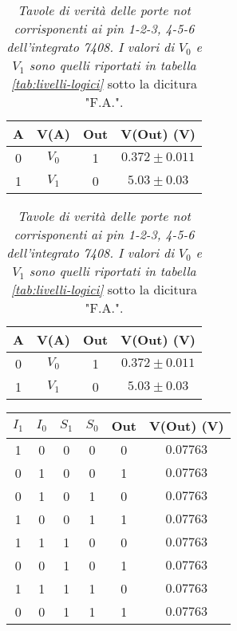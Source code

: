 \begin{table}[H]
  \centering
  \begin{subtable}
    \centering
    \begin{tabular}[t]{c  c | c  c }
      \hline
      A & V(A) & Out & V(Out) (V) \\
      \hline
      0 & $V_{0}$ & 1 & $0.372 \pm 0.011$ \\
      1& $V_{1}$ & 0 & $5.03 \pm 0.03$ \\
      \hline
    \end{tabular}
  \end{subtable}
  \vspace{.5mm}
  \begin{subtable}
    \centering
    \begin{tabular}[t]{c  c | c  c }
      \hline
      A & V(A) & Out & V(Out) (V) \\
      \hline
      0 & $V_{0}$ & 1 & $0.372 \pm 0.011$ \\
      1& $V_{1}$ & 0 & $5.03 \pm 0.03$ \\
      \hline
    \end{tabular}
  \end{subtable}
  \caption{\emph{Tavole di verità delle porte \emph{not} corrisponenti ai pin 1-2-3, 4-5-6 dell'integrato 7408. I valori di $V_{0}$ e $V_{1}$ sono quelli riportati in tabella \ref{tab:livelli-logici}} sotto la dicitura "F.A.".}
  \label{tab:not-multiplexer}
\end{table}

\begin{table}[H]
  \centering
  \begin{tabular}{c c | c c | c c }
    \hline
    $I_{1}$ & $I_{0}$ & $S_{1}$ & $S_{0}$ & Out & V(Out) (V) \\
    \hline
    1 & 0 & 0 & 0 & 0 & $0.07763$ \\
    0 & 1 & 0 & 0 & 1 & $0.07763$ \\
    0 & 1 & 0 & 1 & 0 & $0.07763$ \\
    1 & 0 & 0 & 1 & 1 & $0.07763$ \\
    1 & 1 & 1 & 0 & 0 & $0.07763$ \\
    0 & 0 & 1 & 0 & 1 & $0.07763$ \\
    1 & 1 & 1 & 1 & 0 & $0.07763$ \\
    0 & 0 & 1 & 1 & 1 & $0.07763$ \\
  \end{tabular}
\end{table}
